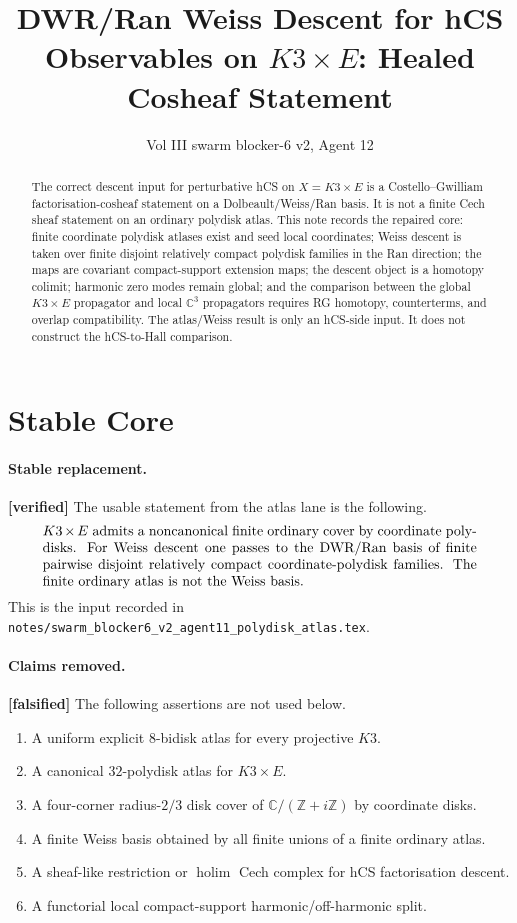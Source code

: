\documentclass[11pt]{article}
\title{DWR/Ran Weiss Descent for hCS Observables on
\texorpdfstring{$K3\times E$}{K3 x E}: Healed Cosheaf Statement}
\author{Vol III swarm blocker-6 v2, Agent 12}
\date{}
\theoremstyle{definition}
\providecommand{\ClaimStatusVerified}{\textbf{[verified]}}
\providecommand{\ClaimStatusFalsified}{\textbf{[falsified]}}
\providecommand{\holim}{\operatorname*{holim}}
\providecommand{\C}{\mathbb{C}}
\providecommand{\Z}{\mathbb{Z}}
\begin{document}
\maketitle

\begin{abstract}
The correct descent input for perturbative hCS on
$X=K3\times E$ is a Costello--Gwilliam factorisation-cosheaf statement
on a Dolbeault/Weiss/Ran basis. It is not a finite Cech sheaf statement
on an ordinary polydisk atlas. This note records the repaired core:
finite coordinate polydisk atlases exist and seed local coordinates;
Weiss descent is taken over finite disjoint relatively compact
polydisk families in the Ran direction; the maps are covariant
compact-support extension maps; the descent object is a homotopy
colimit; harmonic zero modes remain global; and the comparison between
the global $K3\times E$ propagator and local $\C^3$ propagators
requires RG homotopy, counterterms, and overlap compatibility. The
atlas/Weiss result is only an hCS-side input. It does not construct the
hCS-to-Hall comparison.
\end{abstract}

\tableofcontents

\section{Stable Core}
\label{sec:stable-core}

\paragraph{Stable replacement.}
\ClaimStatusVerified{}
The usable statement from the atlas lane is the following.
\[
\begin{minipage}{0.9\linewidth}
$K3\times E$ admits a noncanonical finite ordinary cover by coordinate
polydisks. For Weiss descent one passes to the DWR/Ran basis of finite
pairwise disjoint relatively compact coordinate-polydisk families. The
finite ordinary atlas is not the Weiss basis.
\end{minipage}
\]
This is the input recorded in
\texttt{notes/swarm\_blocker6\_v2\_agent11\_polydisk\_atlas.tex}.

\paragraph{Claims removed.}
\ClaimStatusFalsified{}
The following assertions are not used below.
\begin{enumerate}
\item A uniform explicit $8$-bidisk atlas for every projective $K3$.
\item A canonical $32$-polydisk atlas for $K3\times E$.
\item A four-corner radius-$2/3$ disk cover of $\C/(\Z+i\Z)$ by
coordinate disks.
\item A finite Weiss basis obtained by all finite unions of a finite
ordinary atlas.
\item A sheaf-like restriction or $\holim$ Cech complex for hCS
factorisation descent.
\item A functorial local compact-support harmonic/off-harmonic split.
\end{enumerate}
\end{document}
